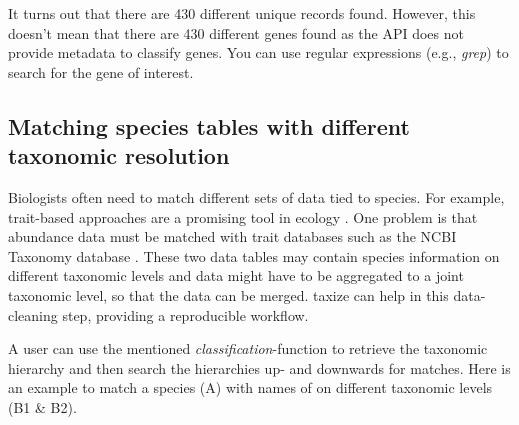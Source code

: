 \begin{sloppypar}
\clearpage
It turns out that there are 430 different unique records found. 
However, this doesn't mean that there are 430 different genes found as the API does not provide metadata to classify genes. 
You can use regular expressions (e.g., \emph{grep}) to search for the gene of interest.


\subsection{Matching species tables with different taxonomic resolution}
Biologists often need to match different sets of data tied to species. 
For example, trait-based approaches are a promising tool in ecology \citep{statzner_can_2010}. 
One problem is that abundance data must be matched with trait databases such as the NCBI Taxonomy database \citep{usseglio-polatera_biological_2000}. 
These two data tables may contain species information on different taxonomic levels and data might have to be aggregated to a joint taxonomic level, so that the data can be merged. 
taxize can help in this data-cleaning step, providing a reproducible workflow.

A user can use the mentioned \emph{classification}-function to retrieve the taxonomic hierarchy and then search the hierarchies up- and downwards for matches. 
Here is an example to match a species (A) with names of on different taxonomic levels (B1 \& B2).

\begin{knitrout}\small
\color{fgcolor}
\end{knitrout}


\end{sloppypar}

